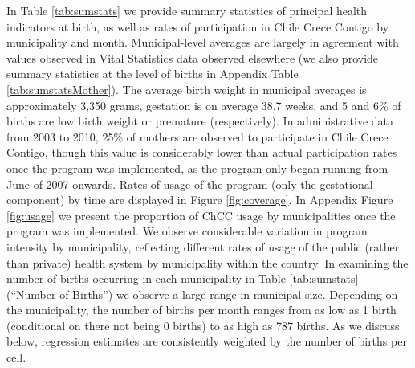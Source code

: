 \documentclass[12pt]{article}
\begin{document}
\begin{spacing}{1.4}
In Table \ref{tab:sumstats} we provide summary statistics of
principal health indicators at birth, as well as rates of participation
in Chile Crece Contigo by municipality and month.  Municipal-level
averages are largely in agreement with values observed in Vital
Statistics data observed elsewhere (we also provide summary statistics
at the level of births in Appendix Table \ref{tab:sumstatsMother}).  The
average birth weight in municipal averages is approximately 3,350 grams,
gestation is on average 38.7 weeks, and 5 and 6\% of births are low birth
weight or premature (respectively).  In administrative data from 2003 to
2010, 25\% of mothers are observed to participate in Chile Crece Contigo,
though this value is considerably lower than actual participation rates
once the program was implemented, as the program only began running from
June of 2007 onwards.  Rates of usage of the program (only the gestational
component) by time are displayed in Figure \ref{fig:coverage}. In Appendix
Figure \ref{fig:usage} we present the proportion of ChCC usage by
municipalities once the program was implemented.  We observe considerable
variation in program intensity by municipality, reflecting different rates
of usage of the public (rather than private) health system by municipality
within the country.  In examining the number of births occurring in each
municipality in Table \ref{tab:sumstats} (``Number of Births'') we
observe a large range in municipal size. Depending on
the municipality, the number of births per month ranges from as low as 1
birth (conditional on there not being 0 births) to as high as 787 births.
As we discuss below, regression estimates are consistently weighted by the
number of births per cell.


\end{spacing}
\end{document}
